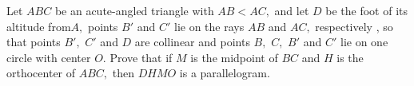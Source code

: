 Let $ABC$ be an acute-angled  triangle with $AB<AC,$  and let $D$ be the foot of its altitude from$A,$ points $B'$ and $C'$ lie on the rays $AB$ and $AC,$ respectively , so that points $B',$ $C'$ and $D$ are collinear and points $B,$ $C,$ $B'$ and $C'$ lie on one circle with center $O.$ Prove that if $M$ is the midpoint of $BC$ and $H$ is the orthocenter of  $ABC,$  then $DHMO$ is a parallelogram.